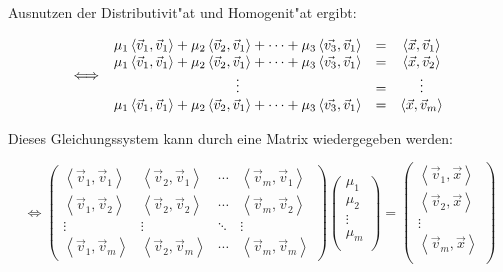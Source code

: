 \documentclass{article}
\newcommand{\lrangle}[1]{\left\langle #1 \right\rangle}
\begin{document}
Ausnutzen der Distributivit"at und Homogenit"at ergibt:

	\begin{equation}
		\iff
		\begin{array}{c c c}
			\mu _1 \lrangle{ \vec{v}_1, \vec{v}_1 } + \mu _2 \lrangle{ \vec{v}_2,
			  \vec{v}_1 } + \cdots + \mu _3 \lrangle{ \vec{v_3}, \vec{v}_1 } &
			= &
			\lrangle{ \vec{x}, \vec{v}_1 } \\
			\mu _1 \lrangle{ \vec{v}_1, \vec{v}_1 } + \mu _2 \lrangle{ \vec{v}_2,
			  \vec{v}_1 } + \cdots + \mu _3 \lrangle{ \vec{v_3}, \vec{v}_1 } &
			= &
			\lrangle{ \vec{x}, \vec{v}_2 } \\
			\vdots &
			= &
			\vdots \\
			\mu _1 \lrangle{ \vec{v}_1, \vec{v}_1 } + \mu _2 \lrangle{ \vec{v}_2,
			  \vec{v}_1 } + \cdots + \mu _3 \lrangle{ \vec{v_3}, \vec{v}_1 } &
			= &
			\lrangle{ \vec{x}, \vec{v}_m }
		\end{array}
	\end{equation}

Dieses Gleichungssystem kann durch eine Matrix wiedergegeben werden:

	\begin{equation}
		\iff
		\begin{pmatrix}
			\lrangle{ \vec{v}_1, \vec{v}_1 } &
			\lrangle{ \vec{v}_2, \vec{v}_1 } &
			\cdots &
			\lrangle{ \vec{v}_m, \vec{v}_1 } \\
			\lrangle{ \vec{v}_1, \vec{v}_2 } &
			\lrangle{ \vec{v}_2, \vec{v}_2 } &
			\cdots &
			\lrangle{ \vec{v}_m, \vec{v}_2 } \\
			\vdots & \vdots & \ddots & \vdots \\
			\lrangle{ \vec{v}_1, \vec{v}_m } &
			\lrangle{ \vec{v}_2, \vec{v}_m } &
			\cdots &
			\lrangle{ \vec{v}_m, \vec{v}_m }
		\end{pmatrix}
		\begin{pmatrix}
			\mu _1 \\
			\mu _2 \\
			\vdots \\
			\mu _m \\
		\end{pmatrix}
		=
		\begin{pmatrix}
			\lrangle{ \vec{v}_1, \vec{x} } \\
			\lrangle{ \vec{v}_2, \vec{x} } \\
			\vdots \\
			\lrangle{ \vec{v}_m, \vec{x} } \\
		\end{pmatrix}
	\end{equation}
\end{document}
